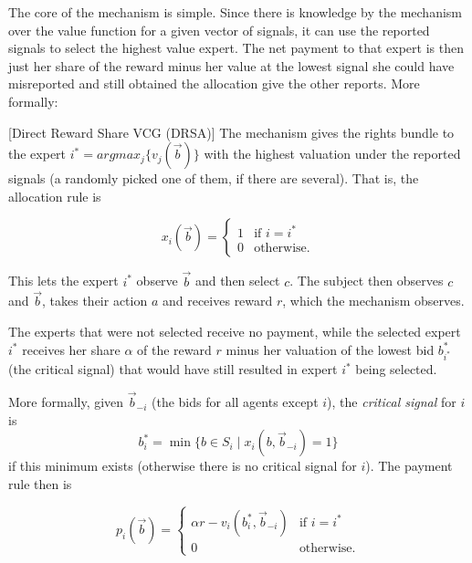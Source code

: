 The core of the mechanism is simple. Since there is knowledge by the mechanism over the value function for a given vector of signals, it can use the reported signals to select the highest value expert. The net payment to that expert is then just her share of the reward minus her value at the lowest signal she could have misreported and still obtained the allocation give the other reports. More formally:

\begin{mech}\label{mech:Direct}[Direct Reward Share VCG (DRSA)]
   The mechanism gives the rights bundle to the expert $i^*=argmax_j \{v_j(\vec b)\} $ with the highest valuation under the reported signals (a randomly picked one of them, if there are several).
   That is, the allocation rule is

   $$x_i(\vec{b}) = \begin{cases} 1 & \text{if } i = i^* \\ 0 & \text{otherwise.} \end{cases}$$

This lets the expert $i^*$ observe  $\vec{b}$ and then select $c$.
The subject then observes $c$ and $\vec{b}$, takes their action $a$ and receives reward $r$, which the mechanism observes. 

   The experts that were not selected receive no payment, while the selected expert $i^*$ receives her share $\alpha$ of the reward $r$ minus her valuation of the lowest bid $b_{i^*}^*$ (the critical signal) that would have still resulted in expert $i^*$ being selected.

More formally, given $\vec{b}_{-i}$ (the bids for all agents except $i$), the {\sl critical signal} for $i$ is
$$b_i^* = \min\{b\in S_i\mid x_i(b,\vec b_{-i})=1\}$$
if this minimum exists (otherwise there is no critical signal for $i$).
The payment rule then is

   $$p_i(\vec b)= \begin{cases}  \alpha r - v_i(b_i^*,\vec{b}_{-i})& \text{if }i = i^* \\ 0 & \text{otherwise.} \end{cases}$$

\end{mech}

